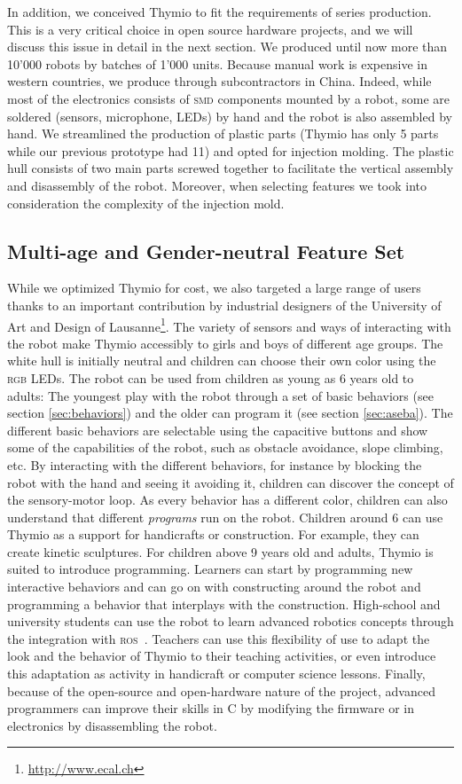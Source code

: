 \documentclass[letterpaper, 10 pt, conference]{ieeeconf}  %
\begin{document}
In addition, we conceived Thymio to fit the requirements of series production.
This is a very critical choice in open source hardware projects, and we will discuss this issue in detail in the next section.
We produced until now more than 10'000 robots by batches of 1'000 units.
Because manual work is expensive in western countries, we produce through subcontractors in China.
Indeed, while most of the electronics consists of \textsc{smd} components mounted by a robot, some are soldered (sensors, microphone, LEDs) by hand and the robot is also assembled by hand.
We streamlined the production of plastic parts (Thymio has only 5 parts while our previous prototype had 11) and opted for injection molding. 
The plastic hull consists of two main parts screwed together to facilitate the vertical assembly and disassembly of the robot.
Moreover, when selecting features we took into consideration the complexity of the injection mold.

\subsection{Multi-age and Gender-neutral Feature Set}

While we optimized Thymio for cost, we also targeted a large range of users thanks to an important contribution by industrial designers of the University of Art and Design of Lausanne\footnote{\url{http://www.ecal.ch}}.
The variety of sensors and ways of interacting with the robot make Thymio accessibly to girls and boys of different age groups.
The white hull is initially neutral and children can choose their own color using the \textsc{rgb} LEDs.
The robot can be used from children as young as 6 years old to adults:
The youngest play with the robot through a set of basic behaviors (see section \ref{sec:behaviors}) and the older can program it (see section \ref{sec:aseba}).
The different basic behaviors are selectable using the capacitive buttons and show some of the capabilities of the robot, such as obstacle avoidance, slope climbing, etc.
By interacting with the different behaviors, for instance by blocking the robot with the hand and seeing it avoiding it, children can discover the concept of the sensory-motor loop. 
As every behavior has a different color, children can also understand that different \emph{programs} run on the robot.
Children around 6 can use Thymio as a support for handicrafts or construction.
For example, they can create kinetic sculptures.
For children above 9 years old and adults, Thymio is suited to introduce programming.
Learners can start by programming new interactive behaviors and can go on with constructing around the robot and programming a behavior that interplays with the construction.
High-school and university students can use the robot to learn advanced robotics concepts through the integration with \textsc{ros}~\cite{quigley2009ros}.
Teachers can use this flexibility of use to adapt the look and the behavior of Thymio to their teaching activities, or even introduce this adaptation as activity in handicraft or computer science lessons.
Finally, because of the open-source and open-hardware nature of the project, advanced programmers can improve their skills in C by modifying the firmware or in electronics by disassembling the robot.
\end{document}
